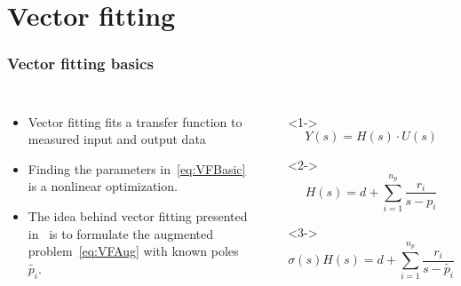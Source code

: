 \section[Theory]{Vector fitting}
\begin{frame}
	\frametitle{Vector fitting basics}
	\begin{columns}[c]
			\begin{itemize}
				\item<1-> Vector fitting fits a transfer function to measured input and output data
				\item<2-> Finding the parameters in~\eqref{eq:VFBasic} is a nonlinear optimization.
				\item<3-> The idea behind vector fitting presented in~\cite{gustavsen_rational_1999} is to formulate the augmented problem~\eqref{eq:VFAug} with known poles $\tilde{p_i}$.
			\end{itemize}
			\begin{itemize}
					\item[]<1->
				\begin{equation}
					Y(s) = H(s)\cdot U(s)
				\end{equation}
			\item[]<2-> 
				\begin{equation}
					\label{eq:VFBasic}
					H(s) = d + \sum^{n_p}_{i=1}\frac{r_i}{s-p_i}
				\end{equation}
			\item[]<3->
				\begin{equation}
					\label{eq:VFAug}
					\sigma(s)H(s) = d + \sum^{n_p}_{i=1}\frac{r_i}{s-\tilde{p_i}}
				\end{equation}
			\end{itemize}
	\end{columns}
\end{frame}
